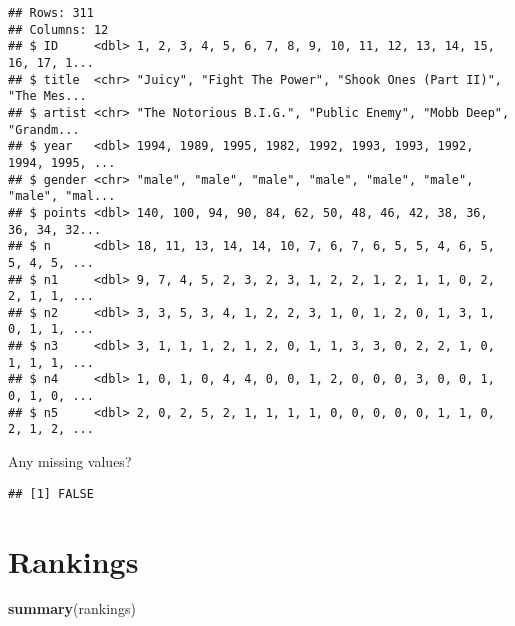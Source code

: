\documentclass[
]{article}
\newenvironment{Shaded}{\begin{snugshade}}{\end{snugshade}}
\newcommand{\KeywordTok}[1]{\textcolor[rgb]{0.13,0.29,0.53}{\textbf{#1}}}
\newcommand{\NormalTok}[1]{#1}
\newcommand{\OperatorTok}[1]{\textcolor[rgb]{0.81,0.36,0.00}{\textbf{#1}}}
\newcommand{\StringTok}[1]{\textcolor[rgb]{0.31,0.60,0.02}{#1}}
\begin{document}
\begin{verbatim}
## Rows: 311
## Columns: 12
## $ ID     <dbl> 1, 2, 3, 4, 5, 6, 7, 8, 9, 10, 11, 12, 13, 14, 15, 16, 17, 1...
## $ title  <chr> "Juicy", "Fight The Power", "Shook Ones (Part II)", "The Mes...
## $ artist <chr> "The Notorious B.I.G.", "Public Enemy", "Mobb Deep", "Grandm...
## $ year   <dbl> 1994, 1989, 1995, 1982, 1992, 1993, 1993, 1992, 1994, 1995, ...
## $ gender <chr> "male", "male", "male", "male", "male", "male", "male", "mal...
## $ points <dbl> 140, 100, 94, 90, 84, 62, 50, 48, 46, 42, 38, 36, 36, 34, 32...
## $ n      <dbl> 18, 11, 13, 14, 14, 10, 7, 6, 7, 6, 5, 5, 4, 6, 5, 5, 4, 5, ...
## $ n1     <dbl> 9, 7, 4, 5, 2, 3, 2, 3, 1, 2, 2, 1, 2, 1, 1, 0, 2, 2, 1, 1, ...
## $ n2     <dbl> 3, 3, 5, 3, 4, 1, 2, 2, 3, 1, 0, 1, 2, 0, 1, 3, 1, 0, 1, 1, ...
## $ n3     <dbl> 3, 1, 1, 1, 2, 1, 2, 0, 1, 1, 3, 3, 0, 2, 2, 1, 0, 1, 1, 1, ...
## $ n4     <dbl> 1, 0, 1, 0, 4, 4, 0, 0, 1, 2, 0, 0, 0, 3, 0, 0, 1, 0, 1, 0, ...
## $ n5     <dbl> 2, 0, 2, 5, 2, 1, 1, 1, 1, 0, 0, 0, 0, 0, 1, 1, 0, 2, 1, 2, ...
\end{verbatim}

Any missing values?

\begin{Shaded}
\end{Shaded}

\begin{verbatim}
## [1] FALSE
\end{verbatim}

\hypertarget{rankings}{%
\section{Rankings}\label{rankings}}

\begin{Shaded}
\begin{Highlighting}[]
\KeywordTok{summary}\NormalTok{(rankings)}
\end{Highlighting}
\end{Shaded}
\end{document}
